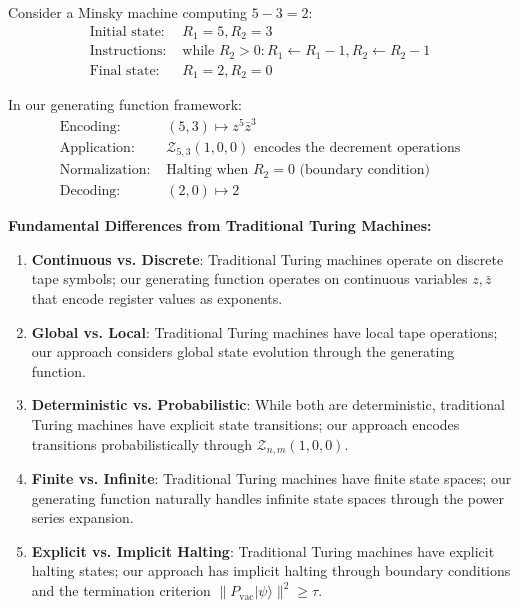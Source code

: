 \begin{example}[Minsky Machine: $5-3=2$]
\label{ex:minsky-5-3-2}
Consider a Minsky machine computing $5-3=2$:
\begin{align}
\text{Initial state: } &R_1 = 5, R_2 = 3 \\
\text{Instructions: } &\text{while } R_2 > 0: R_1 \leftarrow R_1-1, R_2 \leftarrow R_2-1 \\
\text{Final state: } &R_1 = 2, R_2 = 0
\end{align}

In our generating function framework:
\begin{align}
\text{Encoding: } &(5,3) \mapsto z^5 \bar{z}^3 \\
\text{Application: } &\mathcal{Z}_{5,3}(1,0,0) \text{ encodes the decrement operations} \\
\text{Normalization: } &\text{Halting when } R_2 = 0 \text{ (boundary condition)} \\
\text{Decoding: } &(2,0) \mapsto 2
\end{align}
\end{example}

\textbf{Fundamental Differences from Traditional Turing Machines:}

\begin{enumerate}
\item \textbf{Continuous vs. Discrete}: Traditional Turing machines operate on discrete tape symbols; our generating function operates on continuous variables $z, \bar{z}$ that encode register values as exponents.

\item \textbf{Global vs. Local}: Traditional Turing machines have local tape operations; our approach considers global state evolution through the generating function.

\item \textbf{Deterministic vs. Probabilistic}: While both are deterministic, traditional Turing machines have explicit state transitions; our approach encodes transitions probabilistically through $\mathcal{Z}_{n,m}(1,0,0)$.

\item \textbf{Finite vs. Infinite}: Traditional Turing machines have finite state spaces; our generating function naturally handles infinite state spaces through the power series expansion.

\item \textbf{Explicit vs. Implicit Halting}: Traditional Turing machines have explicit halting states; our approach has implicit halting through boundary conditions and the termination criterion $\|P_{\text{vac}}|\psi\rangle\|^2 \ge \tau$.
\end{enumerate}

